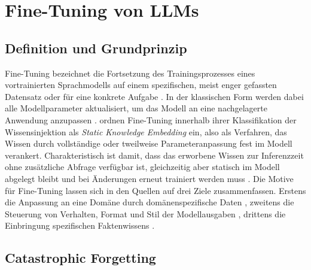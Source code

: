 %

\section{Fine-Tuning von LLMs}
\label{sec:finetuning}

\subsection{Definition und Grundprinzip}
\label{sec:ft-definition}

Fine-Tuning bezeichnet die Fortsetzung des Trainingsprozesses eines vortrainierten Sprachmodells auf einem spezifischen, meist enger gefassten Datensatz oder für eine konkrete Aufgabe \autocite[3]{Ovadia.2024}. In der klassischen Form werden dabei alle Modellparameter aktualisiert, um das Modell an eine nachgelagerte Anwendung anzupassen \autocite[1]{Hu.2022}. \textcite[3f.]{Song.2025} ordnen Fine-Tuning innerhalb ihrer Klassifikation der Wissensinjektion als \textit{Static Knowledge Embedding} ein, also als Verfahren, das Wissen durch vollständige oder tweilweise Parameteranpassung fest im Modell verankert. Charakteristisch ist damit, dass das erworbene Wissen zur Inferenzzeit ohne zusätzliche Abfrage verfügbar ist, gleichzeitig aber statisch im Modell abgelegt bleibt und bei Änderungen erneut trainiert werden muss \autocite[3f.]{Song.2025}. Die Motive für Fine-Tuning lassen sich in den Quellen auf drei Ziele zusammenfassen. Erstens die Anpassung an eine Domäne durch domänenspezifische Daten \autocite[10]{Gao.2024}, zweitens die Steuerung von Verhalten, Format und Stil der Modellausgaben \autocite[10]{Gao.2024}, drittens die Einbringung spezifischen Faktenwissens \autocite[1]{Ovadia.2024}.

\subsection{Catastrophic Forgetting}
\label{sec:ft-forgetting}

